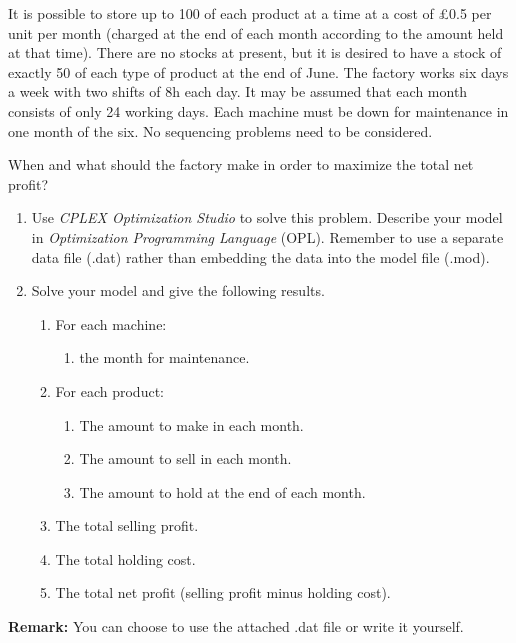 \documentclass[12pt,a4paper]{article}
\theoremstyle{definition}
\begin{document}
\begin{enumerate}
    It is possible to store up to 100 of each product at a time at a cost of \pounds0.5 per unit per month (charged at the end of each month according to the amount held at that time). There are no stocks at present, but it is desired to have a stock of exactly 50 of each type of product at the end of June. The factory works six days a week with two shifts of 8h each day. It may be assumed that each month consists of only 24 working days. Each machine must be down for maintenance in one month of the six. No sequencing problems need to be considered.

    When and what should the factory make in order to maximize the total net profit?

    \begin{enumerate}
    \item
    Use \emph{CPLEX Optimization Studio} to solve this problem. Describe your model in \emph{Optimization Programming Language} (OPL). Remember to use a separate data file (.dat) rather than embedding the data into the model file (.mod).

    \item
    Solve your model and give the following results.
    \begin{enumerate}
    \item
    For each machine:
    \begin{enumerate}
    \item
    the month for maintenance.
    \end{enumerate}
    \item
    For each product:
    \begin{enumerate}
    \item
    The amount to make in each month.
    \item
    The amount to sell in each month.
    \item
    The amount to hold at the end of each month.
    \end{enumerate}
    \item
    The total selling profit.
    \item
    The total holding cost.
    \item
    The total net profit (selling profit minus holding cost).
    \end{enumerate}
    \end{enumerate}
    \textbf{Remark:} You can choose to use the attached .dat file or write it yourself. 


\end{enumerate}
\end{document}
